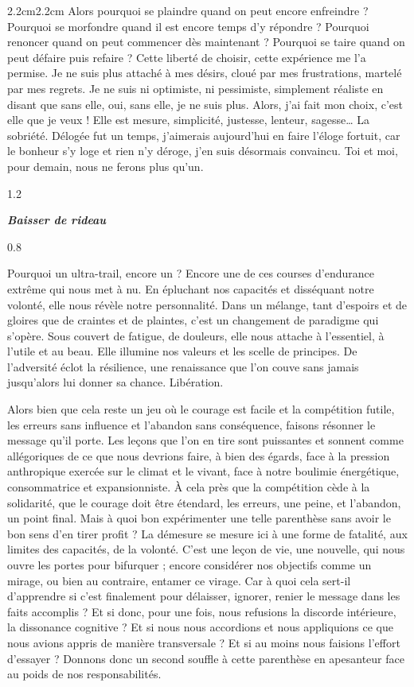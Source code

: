 \begin{adjustwidth}{2.2cm}{2.2cm}
Alors pourquoi se plaindre quand on peut encore enfreindre ? Pourquoi se morfondre quand il est encore temps d’y répondre ? Pourquoi renoncer quand on peut commencer dès maintenant ? Pourquoi se taire quand on peut défaire puis refaire ? Cette liberté de choisir, cette expérience me l’a permise. Je ne suis plus attaché à mes désirs, cloué par mes frustrations, martelé par mes regrets. Je ne suis ni optimiste, ni pessimiste, simplement réaliste en disant que sans elle, oui, sans elle, je ne suis plus. Alors, j’ai fait mon choix, c’est elle que je veux ! Elle est mesure, simplicité, justesse, lenteur, sagesse… La sobriété. Délogée fut un temps, j’aimerais aujourd’hui en faire l’éloge fortuit, car le bonheur s’y loge et rien n’y déroge, j’en suis désormais convaincu. Toi et moi, pour demain, nous ne ferons plus qu’un.
\begin{spacing}{1.2}
~
\end{spacing}
\begin{center}
\textbf{\textit{Baisser de rideau}}
\end{center}
\begin{spacing}{0.8}
~
\end{spacing}
Pourquoi un ultra-trail, encore un ? Encore une de ces courses d’endurance extrême qui nous met à nu. En épluchant nos capacités et disséquant notre volonté, elle nous révèle notre personnalité. Dans un mélange, tant d’espoirs et de gloires que de craintes et de plaintes, c’est un changement de paradigme qui s’opère. Sous couvert de fatigue, de douleurs, elle nous attache à l’essentiel, à l’utile et au beau. Elle illumine nos valeurs et les scelle de principes. De l’adversité éclot la résilience, une renaissance que l’on couve sans jamais jusqu’alors lui donner sa chance. Libération.

Alors bien que cela reste un jeu où le courage est facile et la compétition futile, les erreurs sans influence et l’abandon sans conséquence, faisons résonner le message qu’il porte. Les leçons que l’on en tire sont puissantes et sonnent comme allégoriques de ce que nous devrions faire, à bien des égards, face à la pression anthropique exercée sur le climat et le vivant, face à notre boulimie énergétique, consommatrice et expansionniste. À cela près que la compétition cède à la solidarité, que le courage doit être étendard, les erreurs, une peine, et l’abandon, un point final. Mais à quoi bon expérimenter une telle parenthèse sans avoir le bon sens d’en tirer profit ? La démesure se mesure ici à une forme de fatalité, aux limites des capacités, de la volonté. C’est une leçon de vie, une nouvelle, qui nous ouvre les portes pour bifurquer ; encore considérer nos objectifs comme un mirage, ou bien au contraire, entamer ce virage. Car à quoi cela sert-il d’apprendre si c’est finalement pour délaisser, ignorer, renier le message dans les faits accomplis ? Et si donc, pour une fois, nous refusions la discorde intérieure, la dissonance cognitive ? Et si nous nous accordions et nous appliquions ce que nous avions appris de manière transversale ? Et si au moins nous faisions l’effort d’essayer ? Donnons donc un second souffle à cette parenthèse en apesanteur face au poids de nos responsabilités.


\end{adjustwidth}
